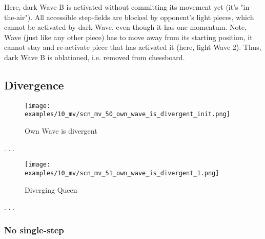 Here, dark Wave B is activated without committing its movement yet (it's "in-the-air").
All accessible step-fields are blocked by opponent's light pieces, which cannot be
activated by dark Wave, even though it has one momentum.
Note, Wave (just like any other piece) has to move away from its starting position,
it cannot stay and re-activate piece that has activated it (here, light Wave 2).
Thus, dark Wave B is oblationed, i.e. removed from chessboard.

\clearpage %

\subsection*{Divergence}
\label{sec:Miranda's veil/Wave/Divergence}

\vspace*{-1.4\baselineskip}
\noindent
\begin{figure}[!h]
\texttt{[image: examples/10\_mv/scn\_mv\_50\_own\_wave\_is\_divergent\_init.png]}
\vspace*{-1.3\baselineskip}
\caption{Own Wave is divergent}
\label{fig:scn_mv_50_own_wave_is_divergent_init}
\end{figure}

\vspace*{-0.4\baselineskip}
. . .

\clearpage %

\vspace*{-2.1\baselineskip}
\noindent
\begin{figure}[!h]
\texttt{[image: examples/10\_mv/scn\_mv\_51\_own\_wave\_is\_divergent\_1.png]}
\vspace*{-1.3\baselineskip}
\caption{Diverging Queen}
\label{fig:scn_mv_51_own_wave_is_divergent_1}
\end{figure}

\vspace*{-0.4\baselineskip}
. . .

\clearpage %

\subsubsection*{No single-step}
\label{sec:Miranda's veil/Wave/Divergence/No single-step}

